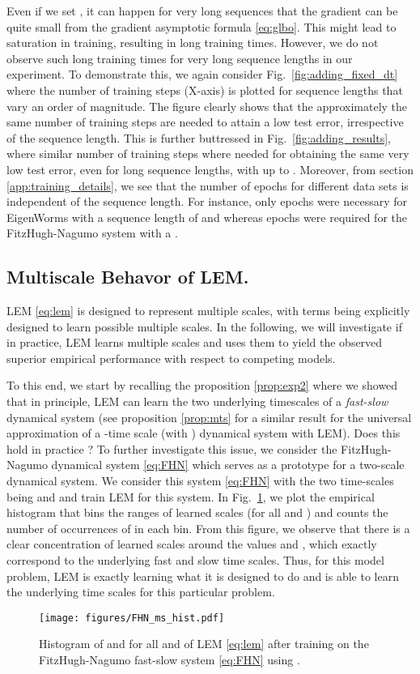 \documentclass{article} \usepackage{iclr2022_conference,times}
\newcommand{\fref}[1] {Fig.~\ref{#1}}
\begin{document}
Even if we set , it can happen for very long sequences  that the gradient can be quite small from the gradient asymptotic formula \eqref{eq:glbo}. This might lead to saturation in training, resulting in long training times. However, we do not observe such long training times for very long sequence lengths in our experiment. To demonstrate this, we again consider \fref{fig:adding_fixed_dt} where the number of training steps (X-axis) is plotted for sequence lengths that vary an order of magnitude. The figure clearly shows that the approximately the same number of training steps are needed to attain a low test error, irrespective of the sequence length. This is further buttressed in \fref{fig:adding_results}, where similar number of training steps where needed for obtaining the same very low test error, even for long sequence lengths, with  up to . Moreover, from section \ref{app:training_details}, we see that the number of epochs for different data sets is independent of the sequence length. For instance, only  epochs were necessary for EigenWorms with a sequence length of  and  whereas  epochs were required for the FitzHugh-Nagumo system with a . 

\subsection{Multiscale Behavor of LEM.}
\label{app:ms}
LEM \eqref{eq:lem} is designed to represent multiple scales, with terms  being explicitly designed to learn possible multiple scales. In the following, we will investigate if in practice, LEM learns multiple scales and uses them to yield the observed superior empirical performance with respect to competing models. 

To this end, we start by recalling the proposition \ref{prop:exp2} where we showed that in principle, LEM can learn the two underlying timescales of a \emph{fast-slow} dynamical system (see proposition \ref{prop:mts} for a similar result for the universal approximation of a -time scale (with ) dynamical system with LEM). Does this hold in practice ? To further investigate this issue, we consider the FitzHugh-Nagumo dynamical system \eqref{eq:FHN} which serves as a prototype for a two-scale dynamical system. We consider this system \eqref{eq:FHN} with the two time-scales being  and  and train LEM for this system. In \fref{fig:FHN_ms_hist}, we plot the empirical histogram that bins the ranges of learned scales  (for all  and ) and counts the number of occurrences of  in each bin. From this figure, we observe that there is a clear concentration of learned scales around the values  and , which exactly correspond to the underlying fast and slow time scales. Thus, for this model problem, LEM is exactly learning what it is designed to do and is able to learn the underlying time scales for this particular problem.
\begin{figure}[ht!]
\centering
\texttt{[image: figures/FHN\_ms\_hist.pdf]}
\caption{Histogram of  and  for all  and  of LEM \eqref{eq:lem} after training on the FitzHugh-Nagumo fast-slow system \eqref{eq:FHN} using .}
\label{fig:FHN_ms_hist}
\end{figure}
\end{document}
